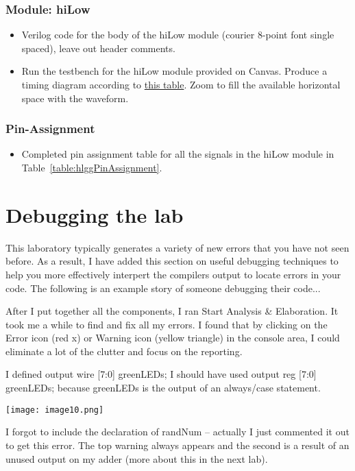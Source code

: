 \subsubsection{Module: hiLow}


\begin{itemize}
\item
  Verilog code for the body of the hiLow module (courier 8-point
  font single spaced), leave out header comments.
\item
  Run the testbench for the hiLow module provided on Canvas.
  Produce a timing diagram according to
  \hyperlink{hlgg:signalColor}{this table}. Zoom to
  fill the available horizontal space with the waveform. 
\end{itemize}

\subsubsection{Pin-Assignment}

\begin{itemize}
\item Completed pin assignment table for all the signals in the hiLow module in Table~\ref{table:hlggPinAssignment}.
\end{itemize}


\section{Debugging the lab}
This laboratory typically generates a variety of new errors that you 
have not seen before.  As a result, I have added this section on 
useful debugging techniques to help you more effectively 
interpert the compilers output to locate errors in your code.
The following is an example story of someone debugging their code...

After I put together all the components, I ran Start Analysis \&
Elaboration. It took me a while to find and fix all my errors. I found
that by clicking on the Error icon (red x) or Warning icon (yellow
triangle) in the console area, I could eliminate a lot of the clutter
and focus on the reporting.

I defined output wire {[}7:0{]} greenLEDs; I should have used output reg
{[}7:0{]} greenLEDs; because greenLEDs is the output of an always/case
statement.

\texttt{[image: image10.png]}

I forgot to include the declaration of randNum -- actually I just
commented it out to get this error. The top warning always appears and
the second is a result of an unused output on my adder (more about this
in the next lab).

